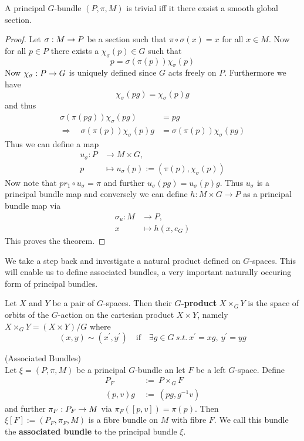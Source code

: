 \begin{theo}
  A principal $G$-bundle $(P,\pi,M)$ is trivial iff it there exsist a smooth global section.

\begin{proof}
  Let $\sigma:M\rightarrow P$ be a section such that $\pi \circ \sigma(x) = x$ for all $x \in M$. Now for all $p\in P$ there exists a $\chi_\sigma(p) \in G$ such that
  $$ p = \sigma(\pi(p)) \chi_\sigma(p) $$
  Now $\chi_\sigma : P \rightarrow G$ is uniquely defined since $G$ acts freely on $P$. Furthermore we have
  $$ \chi_\sigma (pg) = \chi_\sigma(p) g $$
  and thus
  \begin{align}
    \sigma(\pi(pg)) \chi_\sigma(pg) &= pg \\
    \Rightarrow \quad \sigma(\pi(p)) \chi_\sigma(p) g &= \sigma(\pi(p)) \chi_\sigma(pg)
  \end{align}
  Thus we can define a map
  \begin{align}
    u_\sigma : P &\longrightarrow M\times G,\\
    p &\longmapsto u_\sigma(p) := (\pi(p), \chi_\sigma(p))
  \end{align}
  Now note that $pr_1 \circ u_\sigma = \pi$ and further $u_\sigma(pg) = u_\sigma(p)g$. Thus $u_\sigma$ is a principal bundle map and conversely we can define $h: M\times G \longrightarrow P$ as a principal bundle map via
  \begin{align}
    \sigma_u : M &\longrightarrow P,\\
    x &\longmapsto h(x, e_G)
  \end{align}
  This proves the theorem. %
\end{proof}
\end{theo}


We take a step back and investigate a natural product defined on $G$-spaces. This will enable us to define associated bundles, a very important naturally occuring form of principal bundles.

\begin{definition}
  Let $X$ and $Y$ be a pair of $G$-spaces. Then their \textbf{$G$-product} $X \times_G Y$ is the space of orbits of the $G$-action on the cartesian product $X\times Y$, namely $X\times_G Y = (X\times Y)/G$ where
  $$ (x,y) \sim (x^\prime, y^\prime) \quad \text{if} \quad \exists g\in G\  s.t. \ x^\prime = xg, \ y^\prime = yg $$
\end{definition}

\begin{definition} (Associated Bundles)\\
  Let $\xi = (P, \pi, M)$ be a principal $G$-bundle an let $F$ be a left $G$-space. Define
  \begin{align}
    P_F \ &:= \ P \times_G F\\
    (p,v)g \ &:= \ (pg, g^{-1}v)
  \end{align}
  and further $\pi_F: P_F \rightarrow M$ via $\pi_F([p,v]) = \pi(p)$. Then $\xi[F]:= (P_F, \pi_F, M)$ is a fibre bundle on $M$ with fibre $F$. We call this bundle the \textbf{associated bundle} to the principal bundle $\xi$.
\end{definition}

